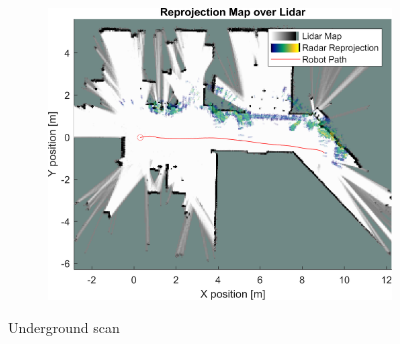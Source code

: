 \begin{figure}[htbp]
\begin{subfigure}[t]{0.475\linewidth}
        \includegraphics[width=\linewidth,max height=.475\textheight]{gfx/results/underground_map.png}
    \end{subfigure}%
    \caption{Underground scan}
\end{figure}

